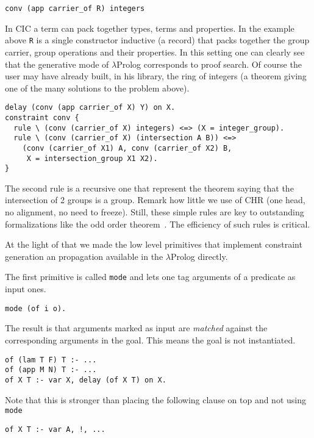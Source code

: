 \documentclass{easychair}
\begin{document}
\begin{verbatim}
conv (app carrier_of R) integers
\end{verbatim}

In CIC a term can pack together types, terms and properties.  In the
example above \verb+R+ is a single constructor inductive (a record)
that packs together the group carrier, group operations and their properties.
In this setting one can clearly see that the generative mode of $\lambda$Prolog corresponds to proof search.  Of course the user may have already built,
in his library, the ring of integers (a theorem giving one of the many
solutions to the problem above).

\begin{verbatim}
delay (conv (app carrier_of X) Y) on X.
constraint conv {
  rule \ (conv (carrier_of X) integers) <=> (X = integer_group).
  rule \ (conv (carrier_of X) (intersection A B)) <=>
    (conv (carrier_of X1) A, conv (carrier_of X2) B,
     X = intersection_group X1 X2).
}
\end{verbatim}

The second rule is a recursive one that represent the theorem saying
that the intersection of 2 groups is a group.
Remark how little we use of CHR (one head, no alignment, no need to freeze).
Still, these simple rules are key to outstanding formalizations like
the odd order theorem~\cite{...}.  The efficiency of such rules is critical.

At the light of that we made the low level primitives that implement
constraint generation an propagation available  in the $\lambda$Prolog
directly.

The first primitive is called \verb+mode+ and lets one tag arguments of
a predicate as input ones.

\begin{verbatim}
mode (of i o).
\end{verbatim}

The result is that arguments marked as input are \emph{matched}
against the corresponding arguments in the goal.
This means the goal is not instantiated.

\begin{verbatim}
of (lam T F) T :- ...
of (app M N) T :- ...
of X T :- var X, delay (of X T) on X.
\end{verbatim}

Note that this is stronger than placing the following clause on top
and not using \verb+mode+

\begin{verbatim}
of X T :- var A, !, ...
\end{verbatim}
\end{document}
